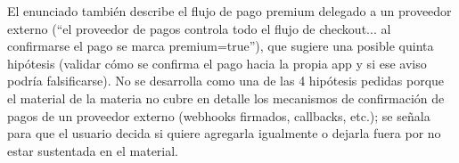 \begin{ojo}
El enunciado también describe el flujo de pago premium delegado a un proveedor externo
(``el proveedor de pagos controla todo el flujo de checkout... al confirmarse el pago se
marca premium=true''), que sugiere una posible quinta hipótesis (validar cómo se confirma
el pago hacia la propia app y si ese aviso podría falsificarse). No se desarrolla como una
de las 4 hipótesis pedidas porque el material de la materia no cubre en detalle los mecanismos
de confirmación de pagos de un proveedor externo (webhooks firmados, callbacks, etc.); se
señala para que el usuario decida si quiere agregarla igualmente o dejarla fuera por no estar
sustentada en el material.
\end{ojo}
